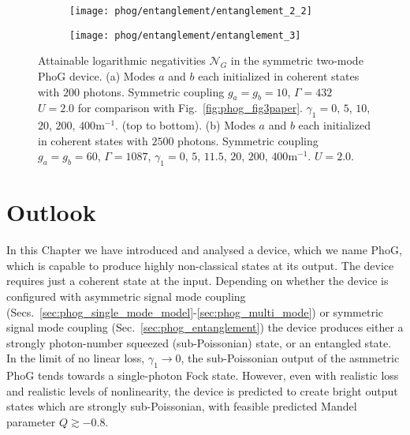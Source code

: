 
\begin{figure}[htp]
\captionsetup{width=0.8\linewidth}
\centering
	\begin{subfigure}{0.7\linewidth}
	\centering
	\caption{}
	\texttt{[image: phog/entanglement/entanglement\_2\_2]}
	\end{subfigure}
	\begin{subfigure}{0.7\linewidth}
	\centering
	\caption{}
	\texttt{[image: phog/entanglement/entanglement\_3]}
	\end{subfigure}
	\caption{\label{fig:phog_negativities} Attainable logarithmic negativities $\mathcal{N}_G$ in the symmetric two-mode PhoG device. (a) Modes $a$ and $b$ each initialized in coherent states with $200$ photons. Symmetric coupling $g_a = g_b = 10$, $\Gamma=432$ $U=2.0$ for comparison with Fig.~\ref{fig:phog_fig3paper}. $\gamma_1 = 0$, $5$, $10$, $20$, $200$, $400$m$^{-1}$. (top to bottom). (b) Modes $a$ and $b$ each initialized in coherent states with $2500$ photons. Symmetric coupling $g_a = g_b = 60$, $\Gamma = 1087$, $\gamma_1 = 0$, $5$, $11.5$, $20$, $200$, $400$m$^{-1}$. $U = 2.0$.}
\end{figure}

\FloatBarrier
\section{Outlook}\label{sec:phog_outlook}
In this Chapter we have introduced and analysed a device, which we name PhoG, which is capable to produce highly non-classical states at its output. The device requires just a coherent state at the input. Depending on whether the device is configured with asymmetric signal mode coupling (Secs.~\ref{sec:phog_single_mode_model}-\ref{sec:phog_multi_mode}) or symmetric signal mode coupling (Sec.~\ref{sec:phog_entanglement}) the device produces either a strongly photon-number squeezed (sub-Poissonian) state, or an entangled state. In the limit of no linear loss, $\gamma_1 \rightarrow 0$, the sub-Poissonian output of the asmmetric PhoG tends towards a single-photon Fock state. However, even with realistic loss and realistic levels of nonlinearity, the device is predicted to create bright output states which are strongly sub-Poissonian, with feasible predicted Mandel parameter $Q \gtrsim -0.8$.


